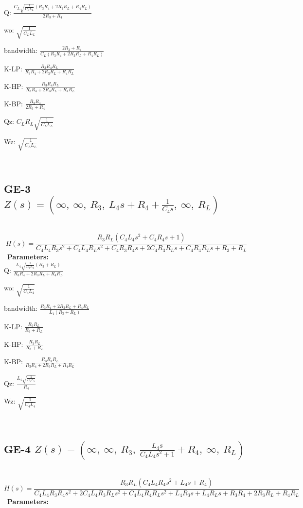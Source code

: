 \documentclass{article}
\begin{document}
Q: $\frac{C_{L} \sqrt{\frac{1}{C_{L} L_{L}}} \left(R_{3} R_{4} + 2 R_{3} R_{L} + R_{4} R_{L}\right)}{2 R_{3} + R_{4}}$\ 

wo: $\sqrt{\frac{1}{C_{L} L_{L}}}$\ 

bandwidth: $\frac{2 R_{3} + R_{4}}{C_{L} \left(R_{3} R_{4} + 2 R_{3} R_{L} + R_{4} R_{L}\right)}$\ 

K-LP: $\frac{R_{3} R_{4} R_{L}}{R_{3} R_{4} + 2 R_{3} R_{L} + R_{4} R_{L}}$\ 

K-HP: $\frac{R_{3} R_{4} R_{L}}{R_{3} R_{4} + 2 R_{3} R_{L} + R_{4} R_{L}}$\ 

K-BP: $\frac{R_{3} R_{4}}{2 R_{3} + R_{4}}$\ 

Qz: $C_{L} R_{L} \sqrt{\frac{1}{C_{L} L_{L}}}$\ 

Wz: $\sqrt{\frac{1}{C_{L} L_{L}}}$\ 

\ 

\subsection{GE-3 $Z(s) = \left( \infty, \  \infty, \  R_{3}, \  L_{4} s + R_{4} + \frac{1}{C_{4} s}, \  \infty, \  R_{L}\right)$ } \ 
\textbf{\[H(s) = \frac{R_{3} R_{L} \left(C_{4} L_{4} s^{2} + C_{4} R_{4} s + 1\right)}{C_{4} L_{4} R_{3} s^{2} + C_{4} L_{4} R_{L} s^{2} + C_{4} R_{3} R_{4} s + 2 C_{4} R_{3} R_{L} s + C_{4} R_{4} R_{L} s + R_{3} + R_{L}}\] } \ 
\textbf{Parameters:}\\ 

Q: $\frac{L_{4} \sqrt{\frac{1}{C_{4} L_{4}}} \left(R_{3} + R_{L}\right)}{R_{3} R_{4} + 2 R_{3} R_{L} + R_{4} R_{L}}$\ 

wo: $\sqrt{\frac{1}{C_{4} L_{4}}}$\ 

bandwidth: $\frac{R_{3} R_{4} + 2 R_{3} R_{L} + R_{4} R_{L}}{L_{4} \left(R_{3} + R_{L}\right)}$\ 

K-LP: $\frac{R_{3} R_{L}}{R_{3} + R_{L}}$\ 

K-HP: $\frac{R_{3} R_{L}}{R_{3} + R_{L}}$\ 

K-BP: $\frac{R_{3} R_{4} R_{L}}{R_{3} R_{4} + 2 R_{3} R_{L} + R_{4} R_{L}}$\ 

Qz: $\frac{L_{4} \sqrt{\frac{1}{C_{4} L_{4}}}}{R_{4}}$\ 

Wz: $\sqrt{\frac{1}{C_{4} L_{4}}}$\ 

\ 

\subsection{GE-4 $Z(s) = \left( \infty, \  \infty, \  R_{3}, \  \frac{L_{4} s}{C_{4} L_{4} s^{2} + 1} + R_{4}, \  \infty, \  R_{L}\right)$ } \ 
\textbf{\[H(s) = \frac{R_{3} R_{L} \left(C_{4} L_{4} R_{4} s^{2} + L_{4} s + R_{4}\right)}{C_{4} L_{4} R_{3} R_{4} s^{2} + 2 C_{4} L_{4} R_{3} R_{L} s^{2} + C_{4} L_{4} R_{4} R_{L} s^{2} + L_{4} R_{3} s + L_{4} R_{L} s + R_{3} R_{4} + 2 R_{3} R_{L} + R_{4} R_{L}}\] } \ 
\textbf{Parameters:}\\ 
\end{document}

